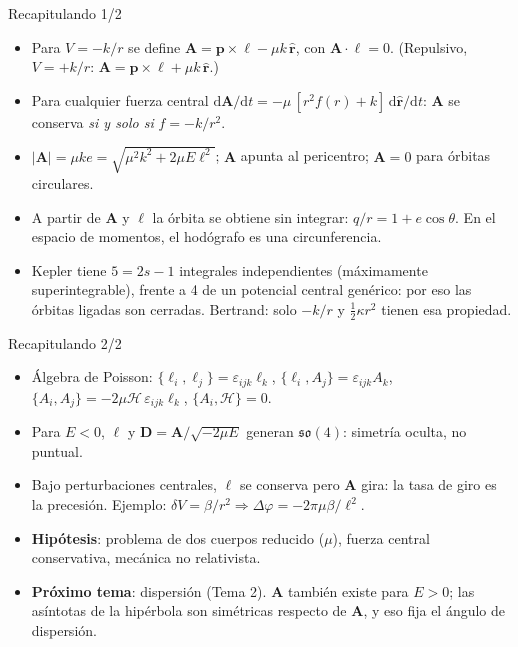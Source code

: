 \documentclass[aspectratio=169]{beamer}
\newcommand{\dd}{\mathrm{d}}
\newcommand{\vp}{\mathbf p}
\newcommand{\vA}{\mathbf A}
\newcommand{\vD}{\mathbf D}
\newcommand{\vl}{\boldsymbol\ell}
\newcommand{\rh}{\hat{\mathbf r}}
\newcommand{\PB}[2]{\{#1,#2\}}
\newcommand{\Hc}{\mathcal H}
\begin{document}
\begin{frame}{Recapitulando 1/2}
\begin{itemize}
  \item<1-> Para $V=-k/r$ se define $\vA=\vp\times\vl-\mu k\,\rh$, con $\vA\cdot\vl=0$.
        (Repulsivo, $V=+k/r$: $\vA=\vp\times\vl+\mu k\,\rh$.)
  \item<2-> Para cualquier fuerza central
        $\dd\vA/\dd t=-\mu\,[r^{2}f(r)+k]\,\dd\rh/\dd t$: $\vA$ se conserva
        \emph{si y solo si} $f=-k/r^{2}$.
  \item<3-> $|\vA|=\mu k e=\sqrt{\mu^{2}k^{2}+2\mu E\ell^{2}}$; $\vA$ apunta al pericentro;
        $\vA=0$ para órbitas circulares.
  \item<4-> A partir de $\vA$ y $\vl$ la órbita se obtiene sin integrar:
        $q/r=1+e\cos\theta$. En el espacio de momentos, el hodógrafo es una circunferencia.
  \item<5-> Kepler tiene $5=2s-1$ integrales independientes (máximamente superintegrable),
        frente a 4 de un potencial central genérico: por eso las órbitas ligadas son cerradas.
        Bertrand: solo $-k/r$ y $\tfrac12\kappa r^{2}$ tienen esa propiedad.
\end{itemize}
\end{frame}

\begin{frame}{Recapitulando 2/2}
\begin{itemize}
  \item<1-> Álgebra de Poisson: $\PB{\ell_i}{\ell_j}=\varepsilon_{ijk}\ell_k$,
        $\PB{\ell_i}{A_j}=\varepsilon_{ijk}A_k$,
        $\PB{A_i}{A_j}=-2\mu\Hc\,\varepsilon_{ijk}\ell_k$, $\PB{A_i}{\Hc}=0$.
  \item<2-> Para $E<0$, $\vl$ y $\vD=\vA/\sqrt{-2\mu E}$ generan $\mathfrak{so}(4)$:
        simetría oculta, no puntual.
  \item<3-> Bajo perturbaciones centrales, $\vl$ se conserva pero $\vA$ gira: la tasa de giro
        es la precesión. Ejemplo: $\delta V=\beta/r^{2}\Rightarrow\Delta\varphi=-2\pi\mu\beta/\ell^{2}$.
  \item<4-> \textbf{Hipótesis}: problema de dos cuerpos reducido ($\mu$), fuerza central
        conservativa, mecánica no relativista.
  \item<5-> \textbf{Próximo tema}: dispersión (Tema 2). $\vA$ también existe para $E>0$;
        las asíntotas de la hipérbola son simétricas respecto de $\vA$, y eso fija el ángulo
        de dispersión.
\end{itemize}
\end{frame}
\end{document}

